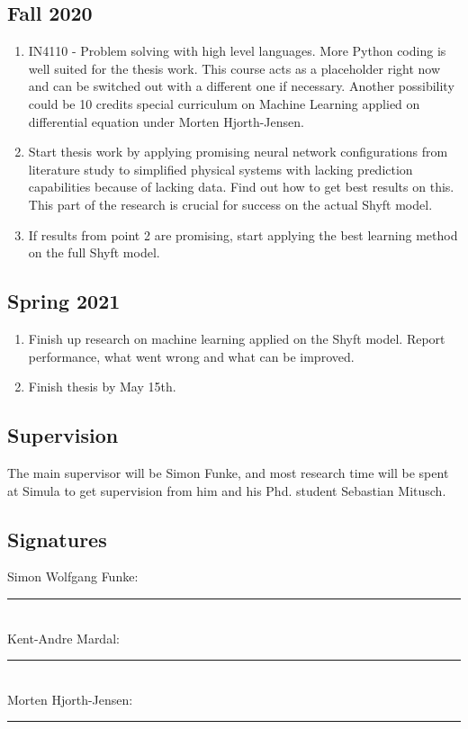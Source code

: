 \documentclass[a4paper,12pt,english]{article}
\begin{document}
\subsection{Fall 2020}
\begin{enumerate}
\item IN4110 - Problem solving with high level languages. More Python coding is well suited for the thesis work. This course acts as a placeholder right now and can be switched out with a different one if necessary. Another possibility could be 10 credits special curriculum on Machine Learning applied on differential equation under Morten Hjorth-Jensen.
\item Start thesis work by applying promising neural network configurations from literature study to simplified physical systems with lacking prediction capabilities because of lacking data. Find out how to get best results on this. This part of the research is crucial for success on the actual Shyft model.
\item If results from point 2 are promising, start applying the best learning method on the full Shyft model.
\end{enumerate}
\subsection{Spring 2021} 
\begin{enumerate}
\item Finish up research on machine learning applied on the Shyft model. Report performance, what went wrong and what can be improved.
\item Finish thesis by May 15th.
\end{enumerate}

\subsection{Supervision}
The main supervisor will be Simon Funke, and most research time will be spent at Simula to get supervision from him and his Phd. student Sebastian Mitusch. 

\subsection{Signatures}
Simon Wolfgang Funke: \\
\noindent\rule[0.5ex]{\linewidth}{1pt}\\

Kent-Andre Mardal: \\
\noindent\rule[0.5ex]{\linewidth}{1pt}\\

Morten Hjorth-Jensen: \\
\noindent\rule[0.5ex]{\linewidth}{1pt}\\
\end{document}
